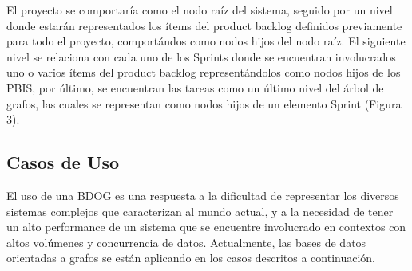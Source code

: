 \documentclass[preprint,12pt]{elsarticle}
\begin{document}
El proyecto se comportaría como el nodo raíz del sistema, seguido por un nivel donde estarán representados los ítems del product backlog definidos
previamente para todo el proyecto, comportándos  como nodos hijos del nodo raíz. El siguiente nivel se relaciona con cada uno de los Sprints donde
se encuentran involucrados uno o varios ítems del product backlog representándolos como nodos hijos de los PBIS, por último, se encuentran las tareas
como un último nivel del árbol de grafos, las cuales se representan como nodos hijos de un elemento Sprint (Figura 3).

\subsection{\textbf{Casos de Uso}}
El uso de una BDOG es una respuesta a la dificultad de representar los diversos sistemas complejos que caracterizan al mundo actual, y a la necesidad de tener un alto performance de un sistema que se encuentre involucrado en contextos con altos volúmenes y concurrencia de datos. Actualmente, las bases de datos orientadas a grafos se están aplicando en los casos descritos a continuación. \\
\end{document}
